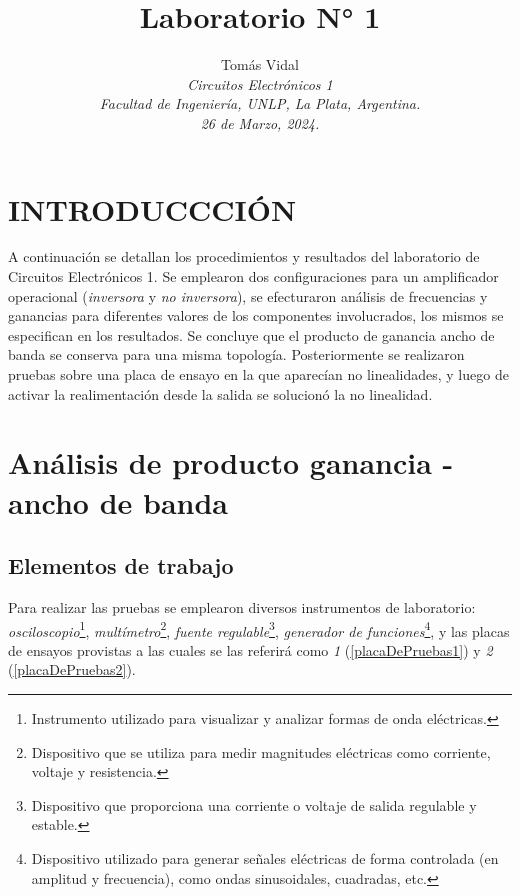 \documentclass[letterpaper, 10 pt, conference]{ieeeconf}  %
\title{\LARGE \bf Laboratorio N° 1}
\author{
  Tom\'as Vidal\\
  {\it Circuitos Electrónicos 1}\\
  {\it Facultad de Ingenier\'ia, UNLP, La Plata, Argentina.}\\
  {\it 26 de Marzo, 2024.}
}                                            %
\begin{document}
\maketitle
\thispagestyle{empty}
\pagestyle{empty}

\section{INTRODUCCCI\'ON}
A continuación se detallan los procedimientos y resultados del laboratorio de Circuitos Electrónicos 1. Se emplearon dos configuraciones para un amplificador operacional (\textit{inversora} y \textit{no inversora}), se efecturaron análisis de frecuencias y ganancias para diferentes valores de los componentes involucrados, los mismos se especifican en los resultados. Se concluye que el producto de ganancia ancho de banda se conserva para una misma topología. Posteriormente se realizaron pruebas sobre una placa de ensayo en la que aparecían no linealidades, y luego de activar la realimentación desde la salida se solucionó la no linealidad.

\section{Análisis de producto ganancia - ancho de banda}
\subsection{Elementos de trabajo}
Para realizar las pruebas se emplearon diversos instrumentos de laboratorio: \textit{osciloscopio}\footnote{Instrumento utilizado para visualizar y analizar formas de onda eléctricas.}, \textit{multímetro}\footnote{Dispositivo que se utiliza para medir magnitudes eléctricas como corriente, voltaje y resistencia.}, \textit{fuente regulable}\footnote{Dispositivo que proporciona una corriente o voltaje de salida regulable y estable.}, \textit{generador de funciones}\footnote{Dispositivo utilizado para generar señales eléctricas de forma controlada (en amplitud y frecuencia), como ondas sinusoidales, cuadradas, etc. }, y las placas de ensayos provistas a las cuales se las referirá como \textit{1} (\ref{placaDePruebas1}) y \textit{2} (\ref{placaDePruebas2}). 
\end{document}
